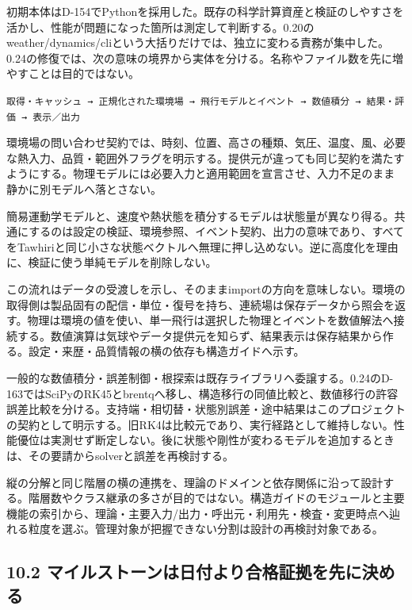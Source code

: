 \documentclass[11pt,a4paper]{article}
\begin{document}
初期本体はD-154でPythonを採用した。既存の科学計算資産と検証のしやすさを活かし、性能が問題になった箇所は測定して判断する。0.20のweather/dynamics/cliという大括りだけでは、独立に変わる責務が集中した。0.24の修復では、次の意味の境界から実体を分ける。名称やファイル数を先に増やすことは目的ではない。

\texttt{取得・キャッシュ\ →\ 正規化された環境場\ →\ 飛行モデルとイベント\ →\ 数値積分\ →\ 結果・評価\ →\ 表示／出力}

環境場の問い合わせ契約では、時刻、位置、高さの種類、気圧、温度、風、必要な熱入力、品質・範囲外フラグを明示する。提供元が違っても同じ契約を満たすようにする。物理モデルには必要入力と適用範囲を宣言させ、入力不足のまま静かに別モデルへ落とさない。

簡易運動学モデルと、速度や熱状態を積分するモデルは状態量が異なり得る。共通にするのは設定の検証、環境参照、イベント契約、出力の意味であり、すべてをTawhiriと同じ小さな状態ベクトルへ無理に押し込めない。逆に高度化を理由に、検証に使う単純モデルを削除しない。

この流れはデータの受渡しを示し、そのままimportの方向を意味しない。環境の取得側は製品固有の配信・単位・復号を持ち、連続場は保存データから照会を返す。物理は環境の値を使い、単一飛行は選択した物理とイベントを数値解法へ接続する。数値演算は気球やデータ提供元を知らず、結果表示は保存結果から作る。設定・来歴・品質情報の横の依存も構造ガイドへ示す。

一般的な数値積分・誤差制御・根探索は既存ライブラリへ委譲する。0.24のD-163ではSciPyのRK45とbrentqへ移し、構造移行の同値比較と、数値移行の許容誤差比較を分ける。支持端・相切替・状態別誤差・途中結果はこのプロジェクトの契約として明示する。旧RK4は比較元であり、実行経路として維持しない。性能優位は実測せず断定しない。後に状態や剛性が変わるモデルを追加するときは、その要請からsolverと誤差を再検討する。

縦の分解と同じ階層の横の連携を、理論のドメインと依存関係に沿って設計する。階層数やクラス継承の多さが目的ではない。構造ガイドのモジュールと主要機能の索引から、理論・主要入力/出力・呼出元・利用先・検査・変更時点へ辿れる粒度を選ぶ。管理対象が把握できない分割は設計の再検討対象である。

\subsection{10.2
マイルストーンは日付より合格証拠を先に決める}\label{ux30deux30a4ux30ebux30b9ux30c8ux30fcux30f3ux306fux65e5ux4ed8ux3088ux308aux5408ux683cux8a3cux62e0ux3092ux5148ux306bux6c7aux3081ux308b}
\end{document}
